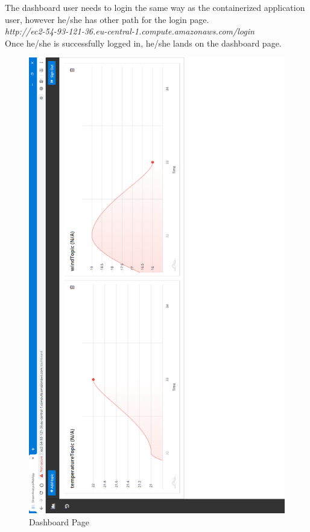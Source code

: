The dashboard user needs to login the same way as the containerized application user, however he/she has other path for the login page.\\

\textit{http://ec2-54-93-121-36.eu-central-1.compute.amazonaws.com/login}\\

Once he/she is successfully logged in, he/she lands on the dashboard page.

\begin{figure}[p]
	\centering
	\noindent
	\includegraphics[width=0.5\paperwidth]{./images/guide/dashboard/dashboard.PNG}
	\caption{Dashboard Page}
	\label{fig:dashboard}
\end{figure}

